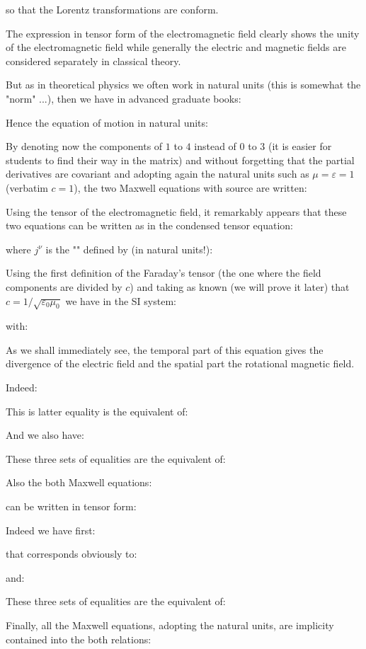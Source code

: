 	so that the Lorentz transformations are conform.

	The expression in tensor form of the electromagnetic field clearly shows the unity of the electromagnetic field while generally the electric and magnetic fields are considered separately in classical theory.

	But as in theoretical physics we often work in natural units (this is somewhat the "norm" ...), then we have in advanced graduate books:
	
	Hence the equation of motion in natural units:
	
	By denoting now the components of $1$ to $4$ instead of $0$ to $3$ (it is easier for students to find their way in the matrix) and without forgetting that the partial derivatives are covariant and adopting again the natural units such as $\mu=\varepsilon=1$ (verbatim $c=1$), the two Maxwell equations with source are written:
	
	Using the tensor of the electromagnetic field, it remarkably appears that these two equations can be written as in the condensed tensor equation:
	
	where $j^\nu$ is the "\label{four vector current}" defined by (in natural units!):
	
	Using the first definition of the Faraday's tensor (the one where the field components are divided by $c$) and taking as known (we will prove it later) that $c=1/\sqrt{\varepsilon_0\mu_0}$ we have in the SI system:
	
	with:
	
	As we shall immediately see, the temporal part of this equation gives the divergence of the electric field and the spatial part the rotational magnetic field.
	
	Indeed:
	
	This is latter equality is the equivalent of:
	
	And we also have:
	
	These three sets of equalities are the equivalent of:
	
	Also the both Maxwell equations:
	
	can be written in tensor form:
	
	Indeed we have first:
	
	that corresponds obviously to:
	
	and:
	
	These three sets of equalities are the equivalent of:
	
	Finally, all the Maxwell equations, adopting the natural units, are implicity contained into the both relations:
	
